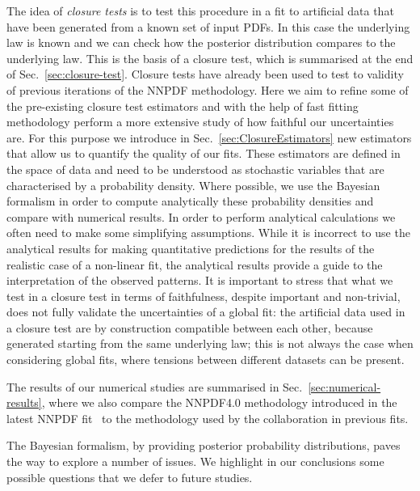 The idea of {\em closure tests} is to test this procedure in a fit to artificial
data that have been generated from a known set of input PDFs. In this case the
underlying law is known and we can check how the posterior distribution compares
to the underlying law. This is the basis of a closure test, which is summarised
at the end of Sec.~\ref{sec:closure-test}. Closure tests have already been used
to test to validity
of previous iterations of the NNPDF methodology. Here we aim to refine some of
the pre-existing closure test estimators and with the help of fast fitting
methodology perform a more extensive study of how faithful our uncertainties
are. 
For this purpose we introduce in Sec.~\ref{sec:ClosureEstimators} new
estimators that allow us to
quantify the quality of our fits. These estimators are defined in the space of
data and need to be understood as stochastic variables that are characterised by
a probability density. Where possible, we use the Bayesian formalism in order to
compute analytically these probability densities and compare with numerical
results. In order to perform analytical calculations we often need to make some
simplifying assumptions. While it is incorrect to use the analytical results for
making quantitative predictions for the results of the realistic case of a
non-linear fit, the analytical results provide a guide to the interpretation of
the observed patterns.
It is important to stress that what we test in a closure test in terms of faithfulness, 
despite important and non-trivial, does not fully validate the uncertainties of a global fit:
the artificial data used in a closure test are by construction compatible between each 
other, because generated starting from the same underlying law; 
this is not always the case when considering global fits, where tensions
between different datasets can be present.  

The results of our numerical studies are summarised in
Sec.~\ref{sec:numerical-results}, where we also
compare the NNPDF4.0 methodology introduced in the latest NNPDF
fit~\cite{NNPDF40} to the methodology used by the collaboration in previous
fits. 
 
The Bayesian formalism, by providing posterior probability distributions, paves
the way to explore a number of issues. We highlight in our conclusions some
possible questions that we defer to future studies. 

